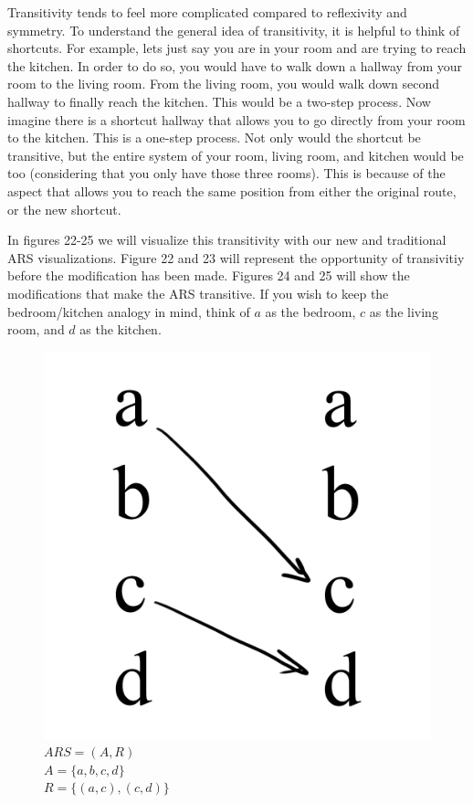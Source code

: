 \documentclass{article}
\begin{document}
\medskip\noindent
Transitivity tends to feel more complicated compared to reflexivity and symmetry. To understand the general idea of transitivity, it is helpful to think of shortcuts. For example, lets just say you are in your room and are trying to reach the kitchen. In order to do so, you would have to walk down a hallway from your room to the living room. From the living room, you would walk down second hallway to finally reach the kitchen. This would be a two-step process. Now imagine there is a shortcut hallway that allows you to go directly from your room to the kitchen. This is a one-step process. Not only would the shortcut be transitive, but the entire system of your room, living room, and kitchen would be too (considering that you only have those three rooms). This is because of the aspect that allows you to reach the same position from either the original route, or the new shortcut.

\medskip\noindent
In figures 22-25 we will visualize this transitivity with our new and traditional ARS visualizations. Figure 22 and 23 will represent the opportunity of transivitiy before the modification has been made. Figures 24 and 25 will show the modifications that make the ARS transitive. If you wish to keep the bedroom/kitchen analogy in mind, think of $a$ as the bedroom, $c$ as the living room, and $d$ as the kitchen.

\begin{figure}[H]
  \centering
  \includegraphics[scale=0.06]{s4}
  \caption[] {
    $ARS = (A, R)$
    \\ $A = \{a, b, c ,d\}$
    \\ $R = \{(a, c), (c, d)\}$
    \endtabular}
\end{figure}
\end{document}
